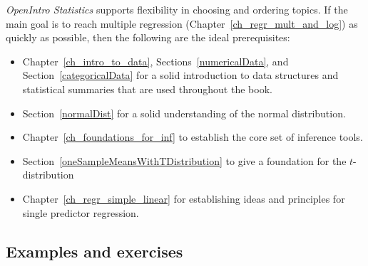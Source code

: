 \noindent%
\emph{OpenIntro Statistics} supports flexibility
in choosing and ordering topics.
If the main goal is to reach multiple regression
(Chapter~\ref{ch_regr_mult_and_log})
as quickly as possible, then the following are the
ideal prerequisites:
\begin{itemize}
\setlength{\itemsep}{0mm}
\item Chapter~\ref{ch_intro_to_data},
    Sections~\ref{numericalData},
    and Section~\ref{categoricalData} for a solid
    introduction to data structures and statistical
    summaries that are used throughout the book.
\item Section~\ref{normalDist}
    for a solid understanding of the normal distribution.
\item Chapter~\ref{ch_foundations_for_inf}
    to establish the core set of inference tools.
%    
%    
\item Section~\ref{oneSampleMeansWithTDistribution}
    to give a foundation for the $t$-distribution
\item Chapter~\ref{ch_regr_simple_linear}
    for establishing ideas and principles for single
    predictor regression.
\end{itemize}


\subsection*{Examples and exercises}

